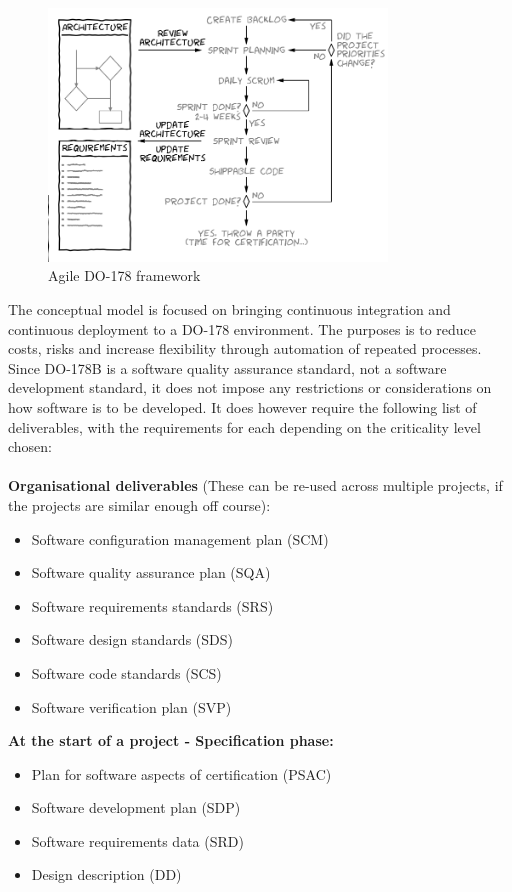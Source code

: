 \documentclass{sig-alternate-05-2015}
\begin{document}
\begin{figure}[t!]
	\centering 
	\includegraphics[width=90mm]{DO178_scrum.png}
	\caption{Agile DO-178 framework}
\end{figure}

The conceptual model is focused on bringing continuous integration and continuous deployment to a DO-178 environment. The purposes is to reduce costs, risks and increase flexibility through automation of repeated processes. Since DO-178B is a software quality assurance standard, not a software development standard, it does not impose any restrictions or considerations on how software is to be developed. It does however require the following list of deliverables, with the requirements for each depending on the criticality level chosen:
\\
\\
\textbf{Organisational deliverables}
(These can be re-used across multiple projects, if the projects are similar enough off course):

\begin{itemize}
	\item Software configuration management plan (SCM)
	\item Software quality assurance plan (SQA)
	\item Software requirements standards (SRS)
	\item Software design standards (SDS)
	\item Software code standards (SCS)
	\item Software verification plan (SVP)
\end{itemize}

\hfill \break
\textbf{At the start of a project - Specification phase:}

\begin{itemize}
	\item Plan for software aspects of certification (PSAC)
	\item Software development plan (SDP)
	\item Software requirements data (SRD)
	\item Design description (DD)
\end{itemize}
\end{document}
